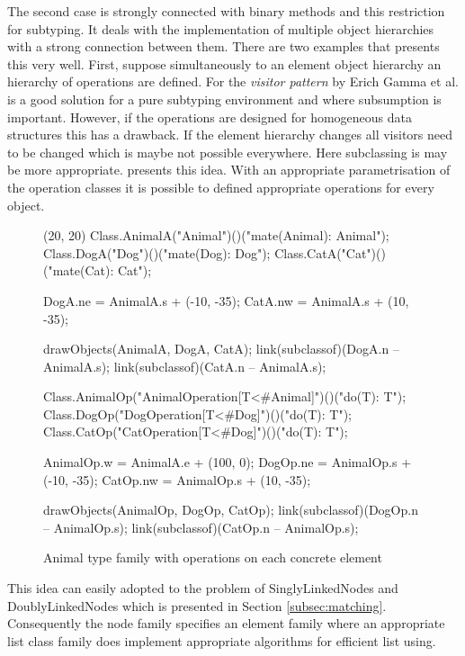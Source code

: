 The second case is strongly connected with binary methods and this
restriction for subtyping. It deals with the implementation of multiple
object hierarchies with a strong connection between them. There are two
examples that presents this very well. First, suppose simultaneously to
an element object hierarchy an hierarchy of operations are defined. For 
the \emph{visitor pattern} by Erich Gamma et al. \cite{gamma_design_1995}
is a good solution for a pure subtyping environment and where subsumption
is important. However, if the operations are designed for homogeneous
data structures this has a drawback. If the element hierarchy changes all
visitors need to be changed which is maybe not possible everywhere. Here
subclassing is may be more appropriate. 
presents this idea. With an appropriate parametrisation of the operation
classes it is possible to defined appropriate operations for every object.

\begin{figure}[H]
	\centering
	\begin{emp}[classdiag](20, 20)
		Class.AnimalA("Animal")()("mate(Animal): Animal");
		Class.DogA("Dog")()("mate(Dog): Dog");
		Class.CatA("Cat")()("mate(Cat): Cat");

		DogA.ne = AnimalA.s + (-10, -35);
		CatA.nw = AnimalA.s + (10, -35);

		drawObjects(AnimalA, DogA, CatA);
		link(subclassof)(DogA.n -- AnimalA.s);
		link(subclassof)(CatA.n -- AnimalA.s);

		Class.AnimalOp("AnimalOperation[T<#Animal]")()("do(T): T");
		Class.DogOp("DogOperation[T<#Dog]")()("do(T): T");
		Class.CatOp("CatOperation[T<#Dog]")()("do(T): T");

		AnimalOp.w = AnimalA.e + (100, 0);
		DogOp.ne = AnimalOp.s + (-10, -35);
		CatOp.nw = AnimalOp.s + (10, -35);

		drawObjects(AnimalOp, DogOp, CatOp);
		link(subclassof)(DogOp.n -- AnimalOp.s);
		link(subclassof)(CatOp.n -- AnimalOp.s);
	\end{emp}
	\caption{Animal type family with operations on each concrete element}
	\label{fig:operationFamily}
\end{figure}

This idea can easily adopted to the problem of SinglyLinkedNodes
and DoublyLinkedNodes which is presented in Section
\ref{subsec:matching}. Consequently the node family specifies an element
family where an appropriate list class family does implement appropriate
algorithms for efficient list using.

